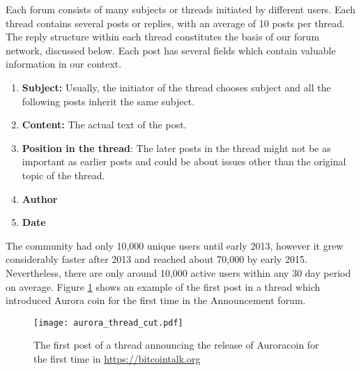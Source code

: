 Each forum consists of many subjects or threads initiated by different users.
Each thread contains several posts or replies, with an average of 10 posts per
thread.  The reply structure within each thread constitutes the basis of our
forum network, discussed below.  Each post has several fields which contain
valuable information in our context.
\begin{enumerate}[topsep=0pt,itemsep=-0.5ex,partopsep=1ex,parsep=1ex]
  \item \textbf{Subject:} Usually, the initiator of the thread chooses subject and all the
    following posts inherit the same subject.
  \item \textbf{Content:} The actual text of the post.
  \item \textbf{Position in the thread}: The later posts in the thread might not be as important
    as earlier posts and could be about issues other than the original topic of the thread.
  \item \textbf{Author}
  \item \textbf{Date}
\end{enumerate}
The community had only 10,000 unique users until early 2013, however it grew considerably faster after 2013 and reached about 70,000 by early 2015.
Nevertheless, there are only around 10,000 active users within any 30 day period on average.
Figure \ref{aurora_thread} shows an example of the first post in a thread which introduced Aurora coin for the first time in the Announcement forum.

\begin{figure}
\texttt{[image: aurora\_thread\_cut.pdf]}
\caption{The first post of a thread announcing the release of Auroracoin for the first time in \url{https://bitcointalk.org} }
\label{aurora_thread}
\end{figure}

